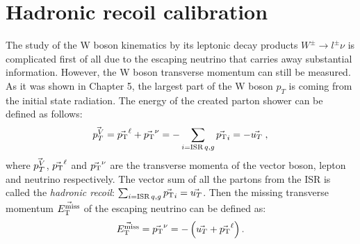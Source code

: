 	
	\clearpage

     \section{Hadronic recoil calibration}
     The study of the W boson kinematics by its leptonic decay products $W^{\pm}\rightarrow l^{\pm} \nu$ is complicated first of all due to the escaping neutrino that carries away substantial information. However, the W boson transverse momentum can still be measured. As it was shown in Chapter 5, the largest part of the W boson $p_T$ is coming from the initial state radiation. The energy of the created parton shower can be defined as follows:
	\begin{equation}
	\vec{p_{T}^{V}}=\vec{p_{\text{T}}}^{\ell}+\vec{p_{\text{T}}}^{\nu} = -\sum_{i=\mathrm{ISR}\, q,g} \vec{p_{\text{T}}}_i = -\vec{u_{T}}\;,
	\end{equation}
	where $\vec{p_{T}^{V}}$, $\vec{p_{\text{T}}}^{\ell}$ and $\vec{p_{\text{T}}}^{\nu}$ are the transverse momenta of the vector boson, lepton and neutrino respectively. The vector sum of all the partons from the ISR is called the \textit{hadronic recoil}: $\sum_{i=\mathrm{ISR}\, q,g} \vec{p_{\text{T}}}_i = \vec{u_{T}}$. Then the missing transverse momentum $\vec{E_{\text{T}}^{\text{miss}}} $ of the escaping neutrino can be defined as:
	\begin{equation}\label{eq:METandNeutrino}
	\vec{E_{\text{T}}^{\text{miss}}} = \vec{p_{\text{T}}}^{\nu} = -\left(\vec{u_{T}}+\vec{p_{\text{T}}}^\ell\right).
	\end{equation}

